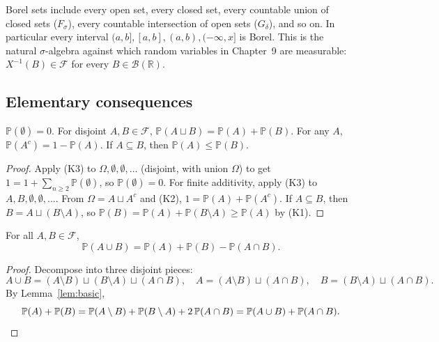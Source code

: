 \begin{remark}
Borel sets include every open set, every closed set, every countable union of closed sets ($F_\sigma$), every countable intersection of open sets ($G_\delta$), and so on. In particular every interval $(a, b], [a, b], (a, b), (-\infty, x]$ is Borel. This is the natural $\sigma$-algebra against which random variables in Chapter~9 are measurable: $X^{-1}(B) \in \mathcal{F}$ for every $B \in \mathcal{B}(\mathbb{R})$.
\end{remark}

\subsection*{Elementary consequences}

\begin{lemma}
\label{lem:basic}
$\mathbb{P}(\emptyset) = 0$. For disjoint $A, B \in \mathcal{F}$, $\mathbb{P}(A \sqcup B) = \mathbb{P}(A) + \mathbb{P}(B)$. For any $A$, $\mathbb{P}(A^{c}) = 1 - \mathbb{P}(A)$. If $A \subseteq B$, then $\mathbb{P}(A) \leq \mathbb{P}(B)$.
\end{lemma}

\begin{proof}
Apply (K3) to $\Omega, \emptyset, \emptyset, \ldots$ (disjoint, with union $\Omega$) to get $1 = 1 + \sum_{n \geq 2} \mathbb{P}(\emptyset)$, so $\mathbb{P}(\emptyset) = 0$. For finite additivity, apply (K3) to $A, B, \emptyset, \emptyset, \ldots$. From $\Omega = A \sqcup A^{c}$ and (K2), $1 = \mathbb{P}(A) + \mathbb{P}(A^{c})$. If $A \subseteq B$, then $B = A \sqcup (B \setminus A)$, so $\mathbb{P}(B) = \mathbb{P}(A) + \mathbb{P}(B \setminus A) \geq \mathbb{P}(A)$ by (K1).
\end{proof}

\begin{theorem}
For all $A, B \in \mathcal{F}$,
\[
  \mathbb{P}(A \cup B) = \mathbb{P}(A) + \mathbb{P}(B) - \mathbb{P}(A \cap B).
\]
\end{theorem}

\begin{proof}
Decompose into three disjoint pieces:
\[
  A \cup B = (A \setminus B) \sqcup (B \setminus A) \sqcup (A \cap B), \quad A = (A \setminus B) \sqcup (A \cap B), \quad B = (B \setminus A) \sqcup (A \cap B).
\]
By Lemma~\ref{lem:basic},
\[
  \mathbb{P}(A) + \mathbb{P}(B) = \mathbb{P}(A \setminus B) + \mathbb{P}(B \setminus A) + 2\,\mathbb{P}(A \cap B) = \mathbb{P}(A \cup B) + \mathbb{P}(A \cap B). \qedhere
\]
\end{proof}


